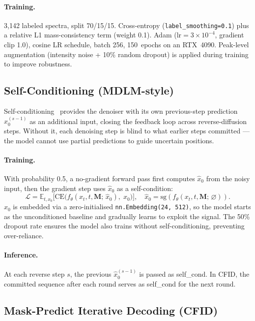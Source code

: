 \documentclass[11pt]{article}
\begin{document}
\paragraph{Training.}
3,142 labeled spectra, split 70/15/15. Cross-entropy (\texttt{label\_smoothing=0.1})
plus a relative L1 mass-consistency term (weight 0.1). Adam ($\text{lr}=3\times10^{-4}$,
gradient clip 1.0), cosine LR schedule, batch 256, 150~epochs on an RTX~4090.
Peak-level augmentation (intensity noise + 10\% random dropout) is applied during
training to improve robustness.

\subsection{Self-Conditioning (MDLM-style)}

Self-conditioning~\cite{d3pm} provides the denoiser with its own previous-step
prediction $\hat{x}_0^{(s-1)}$ as an additional input, closing the feedback loop
across reverse-diffusion steps. Without it, each denoising step is blind to what
earlier steps committed --- the model cannot use partial predictions to guide
uncertain positions.

\paragraph{Training.}
With probability 0.5, a no-gradient forward pass first computes $\hat{x}_0$ from
the noisy input, then the gradient step uses $\hat{x}_0$ as a self-condition:
\begin{equation}
  \mathcal{L} = \mathbb{E}_{t,x_0}\bigl[
    \mathrm{CE}\bigl(f_\theta(x_t, t, \mathbf{M};\,\hat{x}_0),\; x_0\bigr)
  \bigr], \quad \hat{x}_0 = \mathrm{sg}(f_\theta(x_t,t,\mathbf{M};\,\varnothing)).
\end{equation}
$\hat{x}_0$ is embedded via a zero-initialised \texttt{nn.Embedding(24,\,512)},
so the model starts as the unconditioned baseline and gradually learns to exploit
the signal. The 50\% dropout rate ensures the model also trains without
self-conditioning, preventing over-reliance.

\paragraph{Inference.}
At each reverse step $s$, the previous $\hat{x}_0^{(s-1)}$ is passed as
self\_cond. In CFID, the committed sequence after each round serves as
self\_cond for the next round.

\subsection{Mask-Predict Iterative Decoding (CFID)}
\end{document}
